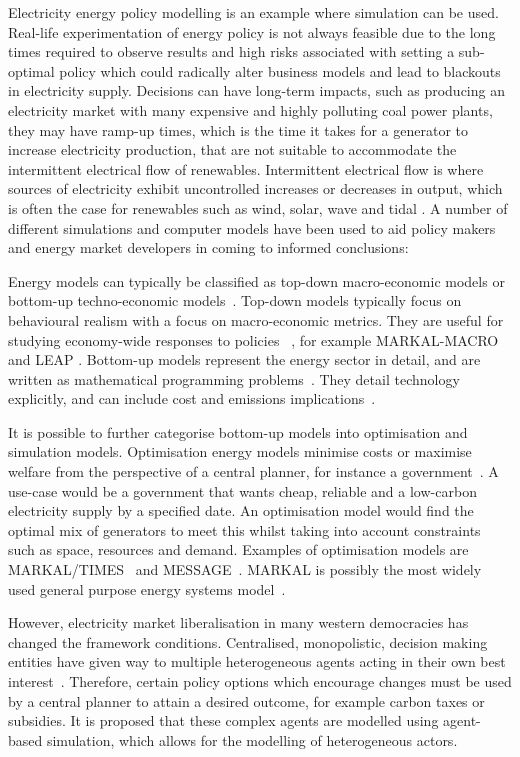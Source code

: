 Electricity energy policy modelling is an example where simulation can be used. Real-life experimentation of energy policy is not always feasible due to the long times required to observe results and high risks associated with setting a sub-optimal policy which could radically alter business models and lead to blackouts in electricity supply. Decisions can have long-term impacts, such as producing an electricity market with many expensive and highly polluting coal power plants, they may have ramp-up times, which is the time it takes for a generator to increase electricity production, that are not suitable to accommodate the intermittent electrical flow of renewables. Intermittent electrical flow is where sources of electricity exhibit uncontrolled increases or decreases in output, which is often the case for renewables such as wind, solar, wave and tidal \cite{Challenges2016}. A number of different simulations and computer models have been used to aid policy makers and energy market developers in coming to informed conclusions:

Energy models can typically be classified as top-down macro-economic models or bottom-up techno-economic models~\cite{Bohringer1998}. Top-down models typically focus on behavioural realism with a focus on macro-economic metrics. They are useful for studying economy-wide responses to policies ~\cite{Hall2016}, for example MARKAL-MACRO \cite{Fishbone1981} and LEAP \cite{Heaps2016}. Bottom-up models represent the energy sector in detail, and are written as mathematical programming problems~\cite{Gargiulo2013}. They detail technology explicitly, and can include cost and emissions implications~\cite{Hall2016}.

It is possible to further categorise bottom-up models into optimisation and simulation models. Optimisation energy models minimise costs or maximise welfare from the perspective of a central planner, for instance a government~\cite{Keles2017}. A use-case would be a government that wants cheap, reliable and a low-carbon electricity supply by a specified date. An optimisation model would find the optimal mix of generators to meet this whilst taking into account constraints such as space, resources and demand. Examples of optimisation models are MARKAL/TIMES~\cite{Fishbone1981} and MESSAGE~\cite{Schrattenholzer1981}. MARKAL is possibly the most widely used general purpose energy systems model~\cite{Pfenninger2014}.

However, electricity market liberalisation in many western democracies has changed the framework conditions. Centralised, monopolistic, decision making entities have given way to multiple heterogeneous agents acting in their own best interest~\cite{Most2010}. Therefore, certain policy options which encourage changes must be used by a central planner to attain a desired outcome, for example carbon taxes or subsidies. It is proposed that these complex agents are modelled using agent-based simulation, which allows for the modelling of heterogeneous actors.

